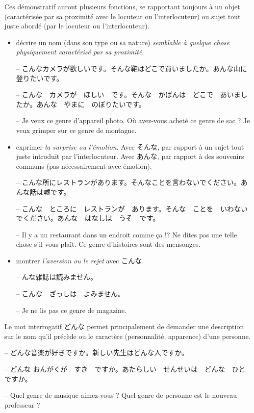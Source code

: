     Ces démonstratif auront plusieurs fonctions, se rapportant toujours à un objet (caractérisée par sa proximité avec le locuteur ou l'interlocuteur) ou sujet tout juste abordé (par le locuteur ou l'interlocuteur).
    \begin{itemize}
        \item décrire un nom (dans son type ou sa nature) \textit{semblable à quelque chose  physiquement caractérisé par sa proximité}.
        \begin{tcolorbox}
            -- こんなカメラが欲しいです。そんな鞄はどこで買いましたか。あんな山に登りたいです。

            -- こんな　カメラが　ほしい　です。そんな　かばんは　どこで　あいましたか。あんな　やまに　のぼりたいです。

            -- Je veux ce genre d'appareil photo. Où avez-vous acheté ce genre de sac ? Je veux grimper sur ce genre de montagne.
        \end{tcolorbox}
        \item exprimer \textit{la surprise ou l'émotion}. Avec そんな, par rapport à un sujet tout juste introduit par l'interlocuteur. Avec あんな, par rapport à des souvenirs communs (pas nécessairement avec émotion).
        \begin{tcolorbox}
            -- こんな所にレストランがあります。そんなことを言わないでください。あんな話は嘘です。

            -- こんな　ところに　レストランが　あります。そんな　ことを　いわないでください。あんな　はなしは　うそ　です。

            -- Il y a un restaurant dans un endroit comme ça !? Ne dites pas une telle chose s'il vous plaît. Ce genre d'histoires sont des mensonges.
        \end{tcolorbox}
        \item montrer \textit{l'aversion ou le rejet} avec こんな.
        \begin{tcolorbox}
            -- んな雑誌は読みません。

            -- こんな　ざっしは　よみません。

            -- Je ne lis pas ce genre de magazine.
        \end{tcolorbox}
    \end{itemize}
    Le mot interrogatif どんな permet principalement de demander une description sur le nom qu'il précède ou le caractère (personnalité, apparence) d'une personne.
    \begin{tcolorbox}
        -- どんな音楽が好きですか。新しい先生はどんな人ですか。

        -- どんな おんがくが　すき　ですか。あたらしい　せんせいは　どんな　ひと　ですか。

        -- Quel genre de musique aimez-vous ? Quel genre de personne est le nouveau professeur ?
    \end{tcolorbox}

